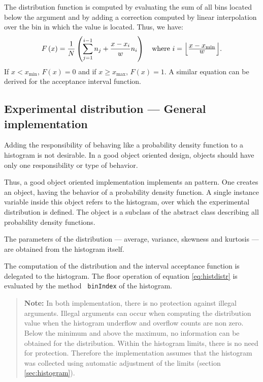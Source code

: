 \documentclass[twoside]{book}
\begin{document}
The distribution function is computed by evaluating the sum of all
bins located below the argument and by adding a correction
computed by linear interpolation over the bin in which the value
is located. Thus, we have:
\begin{equation}
\label{eq:histdistr}
  F\left(x\right)={\displaystyle 1 \over\displaystyle N} \left(\sum_{j=1}^{i-1}n_j
  + {x-x_i \over w}n_i\right)
  \mbox{\quad where $i=\left\lfloor{\displaystyle x-x_{\min}\over\displaystyle w}\right\rfloor$.}
\end{equation}
If $x<x_{\min}$, $F\left(x\right)=0$ and if $x\geq x_{\max}$,
$F\left(x\right)=1$. A similar equation can be derived for the
acceptance interval function.

\subsection{Experimental distribution --- General  implementation}
 Adding the responsibility of
behaving like a probability density function to a histogram is not
desirable. In a good object oriented design, objects should have
only one responsibility or type of behavior.

Thus, a good object oriented implementation implements an
 pattern. One creates an object, having the
behavior of a probability density function. A single instance
variable inside this object refers to the histogram, over which
the experimental distribution is defined. The 
object is a subclass of the abstract class describing all
probability density functions.

The parameters of the distribution --- average, variance, skewness
and kurtosis --- are obtained from the histogram itself.

The computation of the distribution and the interval acceptance
function is delegated to the histogram. The floor operation of
equation \ref{eq:histdistr} is evaluated by the method {\tt
binIndex} of the histogram.

\begin{quote}
{\bf Note:} In both implementation, there is no protection against
illegal arguments. Illegal arguments can occur when computing the
distribution value when the histogram underflow and overflow
counts are non zero. Below the minimum and above the maximum, no
information can be obtained for the distribution. Within the
histogram limits, there is no need for protection. Therefore the
implementation assumes that the histogram was collected using
automatic adjustment of the limits (\cf section
\ref{sec:histogram}).
\end{quote}
\end{document}
